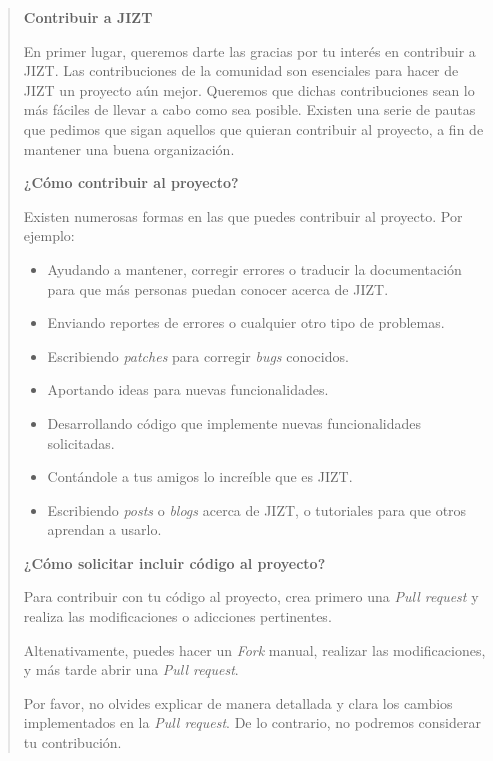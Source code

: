 \begin{quote}
	\textbf{Contribuir a JIZT}
	
	En primer lugar, queremos darte las gracias por tu interés en
	contribuir a JIZT. Las contribuciones de la comunidad son esenciales
	para hacer de JIZT un proyecto aún mejor. Queremos que dichas
	contribuciones sean lo más fáciles de llevar a cabo como sea posible.
	Existen una serie de pautas que pedimos que sigan aquellos que quieran
	contribuir al proyecto, a fin de mantener una buena organización.
	
	\medskip
	\textbf{¿Cómo contribuir al proyecto?}
	
	
	Existen numerosas formas en las que puedes contribuir al proyecto. Por ejemplo:
	
	\vspace{-0.2cm}
	\begin{itemize} [\textbullet]
		\item Ayudando a mantener, corregir errores o traducir la documentación para que más personas puedan conocer acerca de JIZT.
	
		\item Enviando reportes de errores o cualquier otro tipo de problemas.
	
		\item Escribiendo \emph{patches} para corregir \emph{bugs} conocidos.
	
 		\item Aportando ideas para nuevas funcionalidades.
	
		\item Desarrollando código que implemente nuevas funcionalidades solicitadas.
	
		\item Contándole a tus amigos lo increíble que es JIZT.
	
		\item Escribiendo \emph{posts} o \emph{blogs} acerca de JIZT, o tutoriales para que otros aprendan a usarlo.
	\end{itemize}
	
	\medskip
	\textbf{¿Cómo solicitar incluir código al proyecto?}
	
	Para contribuir con tu código al proyecto, crea primero una \emph{Pull request} y
	realiza las modificaciones o adicciones pertinentes.
	
	Altenativamente, puedes hacer un \emph{Fork} manual, realizar las modificaciones,
	y más tarde abrir una \emph{Pull request}.
	
	Por favor, no olvides explicar de manera detallada y clara los cambios
	implementados en la \emph{Pull request}. De lo contrario, no podremos considerar
	tu contribución.
	

\end{quote}
